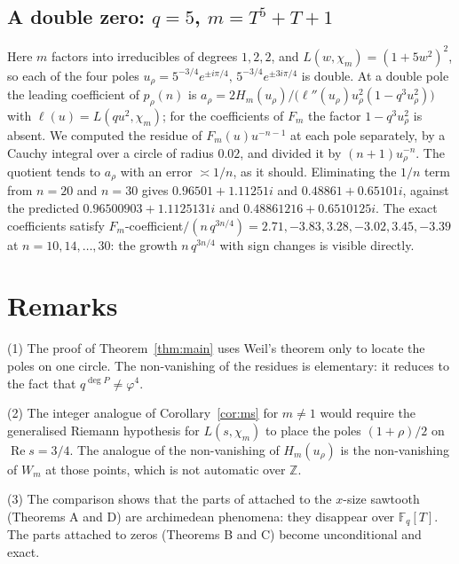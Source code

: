 \documentclass[11pt]{amsart}
\theoremstyle{remark}
\newcommand{\Fq}{\mathbb{F}_q}
\begin{document}
\subsection*{A double zero: $q=5$, $m=T^5+T+1$}
Here $m$ factors into irreducibles of degrees $1,2,2$, and $L(w,\chi_m)=(1+5w^2)^2$, so each of the four poles $u_\rho=5^{-3/4}e^{\pm i\pi/4},\,5^{-3/4}e^{\pm3i\pi/4}$ is double. At a double pole the leading coefficient of $p_\rho(n)$ is $a_\rho=2H_m(u_\rho)/\big(\ell''(u_\rho)u_\rho^2(1-q^3u_\rho^2)\big)$ with $\ell(u)=L(qu^2,\chi_m)$; for the coefficients of $F_m$ the factor $1-q^3u_\rho^2$ is absent. We computed the residue of $F_m(u)u^{-n-1}$ at each pole separately, by a Cauchy integral over a circle of radius $0.02$, and divided it by $(n+1)u_\rho^{-n}$. The quotient tends to $a_\rho$ with an error $\asymp1/n$, as it should. Eliminating the $1/n$ term from $n=20$ and $n=30$ gives $0.96501+1.11251i$ and $0.48861+0.65101i$, against the predicted $0.96500903+1.1125131i$ and $0.48861216+0.6510125i$. The exact coefficients satisfy $F_m$-coefficient$/(n\,q^{3n/4})=2.71,-3.83,3.28,-3.02,3.45,-3.39$ at $n=10,14,\dots,30$: the growth $n\,q^{3n/4}$ with sign changes is visible directly.

\section{Remarks}

(1) The proof of Theorem~\ref{thm:main} uses Weil's theorem only to locate the poles on one circle. The non-vanishing of the residues is elementary: it reduces to the fact that $q^{\deg P}\neq\varphi^4$.

(2) The integer analogue of Corollary~\ref{cor:ms} for $m\ne1$ would require the generalised Riemann hypothesis for $L(s,\chi_m)$ to place the poles $(1+\rho)/2$ on $\operatorname{Re}s=3/4$. The analogue of the non-vanishing of $H_m(u_\rho)$ is the non-vanishing of $W_m$ at those points, which is not automatic over $\mathbb Z$.

(3) The comparison shows that the parts of \cite{K} attached to the $x$-size sawtooth (Theorems A and D) are archimedean phenomena: they disappear over $\Fq[T]$. The parts attached to zeros (Theorems B and C) become unconditional and exact.
\end{document}
